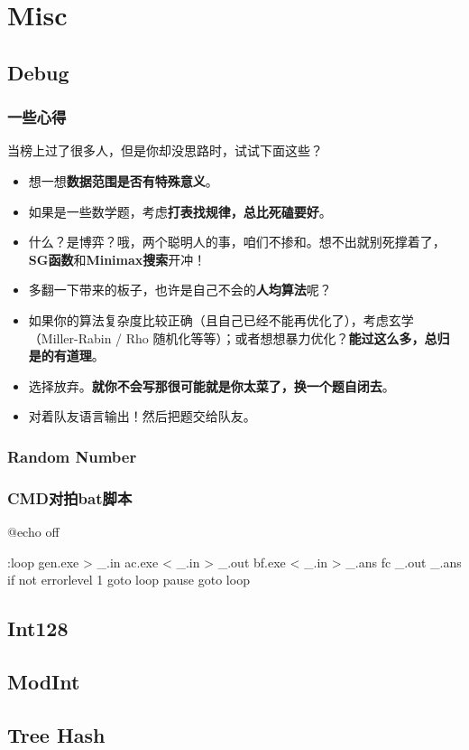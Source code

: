 \chapter{Misc}
\section{Debug}
\subsection{一些心得}
当榜上过了很多人，但是你却没思路时，试试下面这些？
\begin{itemize}
  \item 想一想{\textbf{数据范围是否有特殊意义}}。
  \item 如果是一些数学题，考虑{\textbf{打表找规律，总比死磕要好}}。
  \item 什么？是博弈？哦，两个聪明人的事，咱们不掺和。想不出就别死撑着了，{\textbf{SG函数}和\textbf{Minimax搜索}}开冲！
  \item 多翻一下带来的板子，也许是自己不会的{\textbf{人均算法}}呢？
  \item 如果你的算法复杂度比较正确（且自己已经不能再优化了），考虑玄学（Miller-Rabin / Rho 随机化等等）；或者想想暴力优化？{\textbf{能过这么多，总归是的有道理}}。
  \item 选择放弃。{\textbf{就你不会写那很可能就是你太菜了，换一个题自闭去}}。
  \item 对着队友语言输出！然后把题交给队友。
\end{itemize}

\subsection{Random Number}

\subsection{CMD对拍bat脚本}
\begin{cpplist}
@echo off

:loop
  gen.exe > _.in
  ac.exe < _.in > _.out
  bf.exe < _.in > _.ans
  fc _.out _.ans
if not errorlevel 1 goto loop
pause
goto loop
\end{cpplist}

\section{Int128}

\section{ModInt}

\section{Tree Hash}
